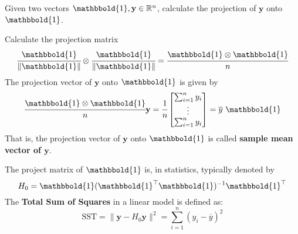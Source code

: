 \begin{Ex}
    Given two vectors $\mathbbold{1}, \mathbf{y}\in\mathbb{R}^n$, calculate the projection of $\mathbf{y}$ onto $\mathbbold{1}$.
    \begin{sol}
        Calculate the projection matrix
        \begin{equation*}
            \cfrac{\mathbbold{1}}{\rVert \mathbbold{1} \lVert} \otimes \cfrac{\mathbbold{1}}{\rVert \mathbbold{1} \lVert} = \cfrac{\mathbbold{1} \otimes \mathbbold{1}}{n} 
        \end{equation*}
        The projection vector of $\mathbf{y}$ onto $\mathbbold{1}$ is given by
        \begin{equation*}
            \cfrac{\mathbbold{1} \otimes \mathbbold{1}}{n} \mathbf{y} =\cfrac{1}{n} 
            \begin{bmatrix}
                \sum_{i = 1}^{n} y_i\\
                \vdots\\
                \sum_{i = 1}^{n} y_i
            \end{bmatrix}
            = \overline{y}\  \mathbbold{1}
        \end{equation*}
        That is, the projection vector of $\mathbf{y}$ onto $\mathbbold{1}$ is called \textbf{sample mean vector of $\mathbf{y}$}.
        \begin{Rem}
            The project matrix of $\mathbbold{1}$ is, in statistics, typically denoted by
            \begin{equation} \label{H-0}
                H_0 = \mathbbold{1}(\mathbbold{1}^{\top} \mathbbold{1})^{-1} \mathbbold{1}^{\top}
            \end{equation}
        The \textbf{Total Sum of Squares} in a linear model is defined as:
        \begin{equation}\label{SST}
            \text{SST} = \lVert \mathbf{y} - H_0\mathbf{y} \rVert^2 = \sum_{i = 1}^n (y_i - \overline{y})^2
        \end{equation}
        \end{Rem}
    \end{sol}
\end{Ex}

